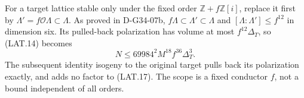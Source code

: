 For a target lattice stable only under the fixed order
$\mathbb Z+f\mathbb Z[i]$, replace it first by
$\Lambda'=f\mathcal O\Lambda\subset\Lambda$.  As proved in
D-G34-07b, $f\Lambda\subset\Lambda'\subset\Lambda$ and
$[\Lambda:\Lambda']\le f^{12}$ in dimension six.  Its pulled-back
polarization has volume at most $f^{12}\Delta_T$, so (LAT.14)
becomes
\[
                   N\le69984^2M^{18}f^{36}\Delta_T^3.         \tag{LAT.18}
\]
The subsequent identity isogeny to the original target pulls
back its polarization exactly, and adds no factor to (LAT.17).
The scope is a fixed conductor $f$, not a bound independent
of all orders.
